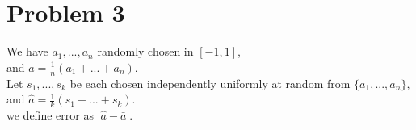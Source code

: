 \section{Problem 3}

We have $a_1, ..., a_n$ randomly chosen in $[-1, 1]$, \\
and $\bar{a} = \frac{1}{n}(a_1 + ... + a_n)$. \\

\noindent Let $s_1, ..., s_k$ be each chosen independently uniformly at random from $\{ a_1, ..., a_n \}$, \\
and $\hat{a} = \frac{1}{k}(s_1 + ... + s_k)$. \\

\noindent we define error as $| \hat{a} - \bar{a} |$.





